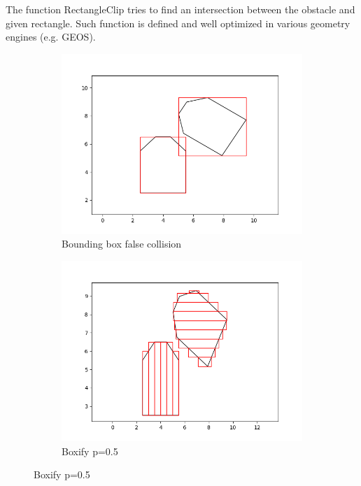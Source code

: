 \documentclass[a4paper,12pt]{article}
\DeclareRobustCommand{\[}{\begin{equation}}
\DeclareRobustCommand{\]}{\end{equation}}
\numberwithin{equation}{section}
\numberwithin{algorithm}{section}
\begin{document}
The function RectangleClip tries to find an intersection between the obstacle and given rectangle. Such function is defined and well optimized in various geometry engines (e.g. GEOS).

\begin{figure}[H]
\centering
    \begin{subfigure}[b]{0.4\textwidth}
        \includegraphics[scale=0.3,width=\textwidth]{images/car_bounding_box.png}
        \caption{Bounding box false collision}
    \end{subfigure}
    \begin{subfigure}[b]{0.4\textwidth}
        \includegraphics[scale=0.3,width=\textwidth]{images/car_boxify_0_5.png}
        \caption{Boxify p=0.5}

\end{subfigure}
\end{figure}
\end{document}
